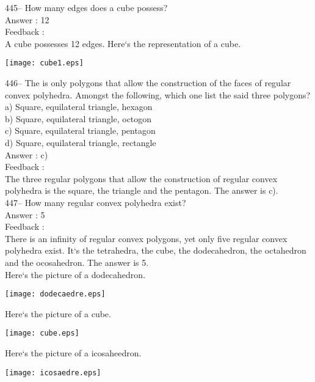 \documentclass[letterpaper, 12pt]{article}
\begin{document}
445-- How many edges does a cube possess?\\

Answer : 12\\

Feedback : \\
A cube possesses 12 edges. Here`s the representation of a cube.\\
    \begin{center}
    \texttt{[image: cube1.eps]}
    \end{center}



446-- The is only polygons that allow the construction of the faces of regular convex polyhedra. 
Amongst the following, which one list the said three polygons?\\
a) Square, equilateral triangle, hexagon\\
b) Square, equilateral triangle, octogon\\
c) Square, equilateral triangle, pentagon\\
d) Square, equilateral triangle, rectangle\\


Answer : c)\\

Feedback : \\
The three regular polygons that allow the construction of regular convex polyhedra is the square, the triangle and the pentagon.  The answer is c).\\

447-- How many regular convex polyhedra exist?\\

Answer : 5\\

Feedback : \\
There is an infinity of regular convex polygons, yet only five regular convex polyhedra exist. It`s the tetrahedra, the cube, the dodecahedron, the octahedron and the ocosahedron.
The answer is 5.\\
Here`s the picture of a dodecahedron.\\
    \begin{center}
    \texttt{[image: dodecaedre.eps]}
    \end{center}
Here`s the picture of a cube.\\
    \begin{center}
    \texttt{[image: cube.eps]}
    \end{center}
Here`s the picture of a icosaheedron.\\
    \begin{center}
    \texttt{[image: icosaedre.eps]}
    \end{center}
\end{document}
